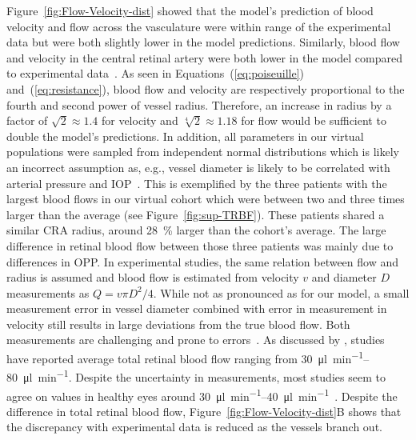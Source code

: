 \documentclass[11pt,]{article}
\begin{document}
Figure~\ref{fig:Flow-Velocity-dist} showed that the model's prediction of blood velocity and flow across the vasculature were within range of the experimental data but were both slightly lower in the model predictions\cite{Riva1985,DoblhoffDier2014}.
Similarly, blood flow and velocity in the central retinal artery were both lower in the model compared to experimental data~\cite{DoblhoffDier2014,Riva1985,Dorner2009,Feke_1989}.
As seen in Equations~(\ref{eq:poiseuille}) and~(\ref{eq:resistance}), blood flow and velocity are respectively proportional to the fourth and second power of vessel radius.
Therefore, an increase in radius by a factor of $\sqrt{2}\approx 1.4$ for velocity and $\sqrt[4]{2}\approx 1.18$ for flow would be sufficient to double the model's predictions.
In addition, all parameters in our virtual populations were sampled from independent normal distributions which is likely an incorrect assumption as, e.g., vessel diameter is likely to be correlated with arterial pressure and IOP~\cite{Dziedziak_2022}.
This is exemplified by the three patients with the largest blood flows in our virtual cohort which were between two and three times larger than the average (see Figure~\ref{fig:sup-TRBF}).
These patients shared a similar CRA radius, around \SI{28}{\percent} larger than the cohort's average.
The large difference in retinal blood flow between those three patients was mainly due to differences in OPP.
In experimental studies, the same relation between flow and radius is assumed and blood flow is estimated from velocity $v$ and diameter $D$ measurements as $Q=v\pi D^2/4$.
While not as pronounced as for our model, a small measurement error in vessel diameter combined with error in measurement in velocity still results in large deviations from the true blood flow.
Both measurements are challenging and prone to errors~\cite{Leitgeb_2014}.
As discussed by \citet{DoblhoffDier2014}, studies have reported average total retinal blood flow ranging from \SIrange[per-mode=symbol]{30}{80}{\micro\litre\per\minute}\cite{DoblhoffDier2014,Riva1985,Feke_1989}.
Despite the uncertainty in measurements, most studies seem to agree on values in healthy eyes around \SIrange{30}{40}{\micro\litre\per\minute}~\cite{DoblhoffDier2014,Riva1985}.
Despite the difference in total retinal blood flow, Figure~\ref{fig:Flow-Velocity-dist}B shows that the discrepancy with experimental data is reduced as the vessels branch out.
\end{document}
